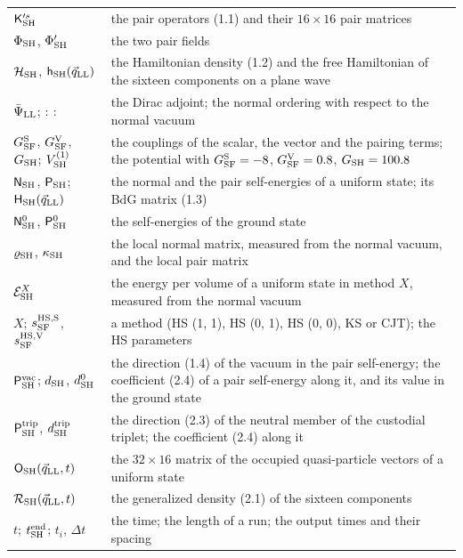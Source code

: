 \documentclass[
  10pt,
]{article}
\begin{document}
\begin{longtable}[]{@{}
  >{\raggedright\arraybackslash}p{}
  >{\raggedright\arraybackslash}p{}@{}}
\(\mathsf K'^s_{\rm SH}\) & the pair operators (1.1) and their
\(16\times16\) pair matrices \\
\(\Phi_{\rm SH}\), \(\Phi'_{\rm SH}\) & the two pair fields \\
\(\mathcal H_{\rm SH}\), \(\mathsf h_{\rm SH}(\vec q_{\rm LL})\) & the
Hamiltonian density (1.2) and the free Hamiltonian of the sixteen
components on a plane wave \\
\(\bar\Psi_{\rm LL}\); \({:}\ {:}\) & the Dirac adjoint; the normal
ordering with respect to the normal vacuum \\
\(G^{\rm S}_{\rm SF}\), \(G^{\rm V}_{\rm SF}\), \(G_{\rm SH}\);
\(V^{(1)}_{\rm SH}\) & the couplings of the scalar, the vector and the
pairing terms; the potential with \(G^{\rm S}_{\rm SF}=-8\),
\(G^{\rm V}_{\rm SF}=0.8\), \(G_{\rm SH}=100.8\) \\
\(\mathsf N_{\rm SH}\), \(\mathsf P_{\rm SH}\);
\(\mathsf H_{\rm SH}(\vec q_{\rm LL})\) & the normal and the pair
self-energies of a uniform state; its BdG matrix (1.3) \\
\(\mathsf N^0_{\rm SH}\), \(\mathsf P^0_{\rm SH}\) & the self-energies
of the ground state \\
\(\varrho_{\rm SH}\), \(\kappa_{\rm SH}\) & the local normal matrix,
measured from the normal vacuum, and the local pair matrix \\
\(\mathcal E^X_{\rm SH}\) & the energy per volume of a uniform state in
method \(X\), measured from the normal vacuum \\
\(X\); \(s^{\rm HS,S}_{\rm SF}\), \(s^{\rm HS,V}_{\rm SF}\) & a method
(HS (1, 1), HS (0, 1), HS (0, 0), KS or CJT); the HS parameters \\
\(\mathsf P^{\rm vac}_{\rm SH}\); \(d_{\rm SH}\), \(d^0_{\rm SH}\) & the
direction (1.4) of the vacuum in the pair self-energy; the coefficient
(2.4) of a pair self-energy along it, and its value in the ground
state \\
\(\mathsf P^{\rm trip}_{\rm SH}\), \(d^{\rm trip}_{\rm SH}\) & the
direction (2.3) of the neutral member of the custodial triplet; the
coefficient (2.4) along it \\
\(\mathsf O_{\rm SH}(\vec q_{\rm LL},t)\) & the \(32\times16\) matrix of
the occupied quasi-particle vectors of a uniform state \\
\(\mathcal R_{\rm SH}(\vec q_{\rm LL},t)\) & the generalized density
(2.1) of the sixteen components \\
\(t\); \(t^{\rm end}_{\rm SH}\); \(t_i\), \(\Delta t\) & the time; the
length of a run; the output times and their spacing \\

\end{longtable}
\end{document}
